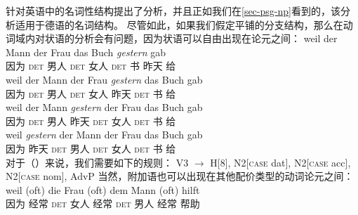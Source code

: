 \citet[]{GKPS85a}针对英语中的名词性结构提出了\xbarc 分析，并且正如我们在\ref{sec-psg-np}看到的，该分析适用于德语的名词结构。
尽管如此，如果我们假定平铺的分支结构，那么在动词域内对状语的分析会有问题，因为状语可以自由出现在论元之间：
\eal
\ex 
\gll weil der Mann der Frau das Buch \emph{gestern} gab\\
	 因为 \textsc{det} 男人 \textsc{det} 女人 \textsc{det} 书 昨天 给\\
\ex 
\gll weil der Mann der Frau \emph{gestern} das Buch gab\\
	 因为 \textsc{det} 男人 \textsc{det} 女人 昨天 \textsc{det} 书 给\\
\ex 
\gll weil der Mann \emph{gestern} der Frau das Buch gab\\
	 因为 \textsc{det} 男人 昨天 \textsc{det} 女人 \textsc{det} 书 给\\
\ex 
\gll weil \emph{gestern} der Mann der Frau das Buch gab\\
	 因为 昨天 \textsc{det} 男人 \textsc{det} 女人 \textsc{det} 书 给\\
\zl
对于（）来说，我们需要如下的规则：
\ea
\label{regel-ditransitiv-adv}
V3  $\to$ H[8], N2[\textsc{case} dat], N2[\textsc{case} acc], N2[\textsc{case} nom], AdvP
\z
当然，附加语也可以出现在其他配价类型的动词论元之间：
\ea
\gll weil (oft) die Frau (oft) dem Mann (oft) hilft\\
	因为 \spacebr{}经常 \textsc{det} 女人 \spacebr{}经常 \textsc{det} 男人 \spacebr{}经常 帮助\\
